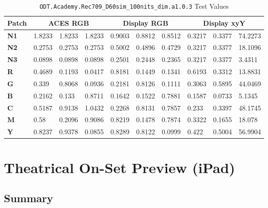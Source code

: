 \begin{table}[ht!]
    \centering
    \begin{tabular}{|l|l|l|l|l|l|l|l|l|l|}
        \hline
        \multicolumn{1}{|c|}{\textbf{Patch}} & \multicolumn{3}{c|}{\textbf{ACES RGB}} & \multicolumn{3}{c|}{\textbf{Display RGB}} & \multicolumn{3}{c|}{\textbf{Display xyY}} \\ \hline
        \textbf{N1} & 1.8233 & 1.8233 & 1.8233 & 0.9003 & 0.8812 & 0.8512 & 0.3217 & 0.3377 & 74.2273 \\
        \textbf{N2} & 0.2753 & 0.2753 & 0.2753 & 0.5002 & 0.4896 & 0.4729 & 0.3217 & 0.3377 & 18.1096 \\
        \textbf{N3} & 0.0898 & 0.0898 & 0.0898 & 0.2501 & 0.2448 & 0.2365 & 0.3217 & 0.3377 & 3.4311  \\
        \textbf{R}  & 0.4689 & 0.1193 & 0.0417 & 0.8181 & 0.1449 & 0.1341 & 0.6193 & 0.3312 & 13.8831 \\
        \textbf{G}  & 0.339  & 0.8068 & 0.0936 & 0.2181 & 0.8126 & 0.1111 & 0.3063 & 0.5895 & 44.0469 \\
        \textbf{B}  & 0.2162 & 0.133  & 0.8711 & 0.1642 & 0.1522 & 0.7881 & 0.1587 & 0.0733 & 5.1345  \\
        \textbf{C}  & 0.5187 & 0.9138 & 1.0432 & 0.2268 & 0.8131 & 0.7857 & 0.233  & 0.3397 & 48.1745 \\
        \textbf{M}  & 0.58   & 0.2096 & 0.9086 & 0.8219 & 0.1478 & 0.7874 & 0.3322 & 0.1655 & 18.078  \\
        \textbf{Y}  & 0.8237 & 0.9378 & 0.0855 & 0.8289 & 0.8122 & 0.0999 & 0.422  & 0.5004 & 56.9904 \\
        \hline
        \end{tabular}
        \caption[Theatrical On-Set Preview - Test Values]{\texttt{ODT.Academy.Rec709\_D60sim\_100nits\_dim.a1.0.3} Test Values}
        \label{tab:testValues-rec709d60sim}
\end{table}

\clearpage
\section{Theatrical On-Set Preview (iPad)}
\label{sec:ot-app-iPad-d60sim}

\subsection{Summary}
\label{subsec:summary-iPad-d60sim}


